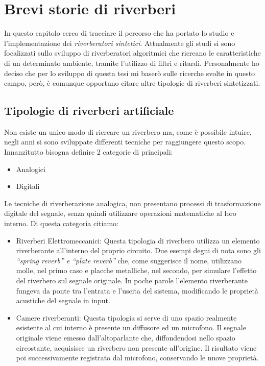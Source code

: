 
\chapter{Brevi storie di riverberi}
\label{chp:Brevi storie di riverberi}

In questo capitolo cerco di tracciare il percorso che ha portato lo studio e
l’implementazione dei \textit{riverberatori sintetici}. Attualmente gli studi
si sono focalizzati sullo sviluppo di riverberatori algoritmici che ricreano le
caratteristiche di un determinato ambiente, tramite l’utilizzo di filtri e
ritardi. Personalmente ho deciso che per lo sviluppo di questa tesi mi baserò
sulle ricerche svolte in questo campo, però, è comunque opportuno citare altre
tipologie di riverberi sintetizzati.

\section{Tipologie di riverberi artificiale}

Non esiste un unico modo di ricreare un riverbero ma, come è possibile intuire, negli anni si sono sviluppate differenti tecniche per raggiungere questo scopo.
Innanzitutto bisogna definire 2 categorie di principali:

\begin{itemize}
\item Analogici
\item Digitali
\end{itemize}

Le tecniche di riverberazione analogica, non presentano processi di trasformazione digitale del segnale, senza quindi utilizzare operazioni matematiche al loro interno.
Di questa categoria citiamo:

\begin{itemize}
\item Riverberi Elettromeccanici: Questa tipologia di riverbero utilizza un elemento riverberante all’interno del proprio circuito. Due esempi degni di nota sono gli \emph{“spring reverb” e “plate reverb”} che, come suggerisce il nome, utilizzano molle, nel primo caso e placche metalliche, nel secondo, per simulare l’effetto del riverbero sul segnale originale. In poche parole l’elemento riverberante fungeva da ponte tra l’entrata e l’uscita del sistema, modificando le proprietà acustiche del segnale in input.
\item Camere riverberanti: Questa tipologia si serve di uno spazio realmente esistente al cui interno è presente un diffusore ed un microfono. Il segnale originale viene emesso dall’altoparlante che, diffondendosi nello spazio circostante, acquisisce un riverbero non presente all’origine. Il risultato viene poi successivamente registrato dal microfono, conservando le nuove proprietà.
\end{itemize}

